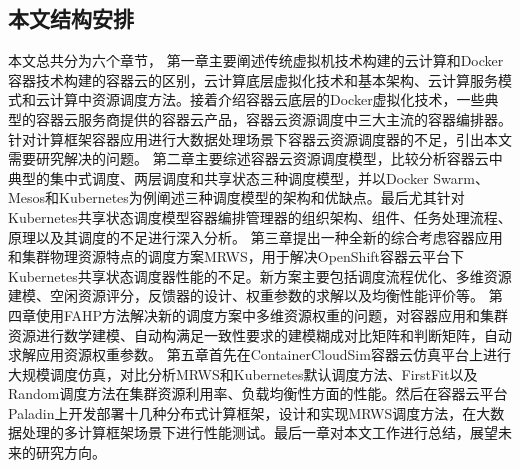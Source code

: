 \subsection{本文结构安排}
本文总共分为六个章节，
第一章主要阐述传统虚拟机技术构建的云计算和Docker容器技术构建的容器云的区别，云计算底层虚拟化技术和基本架构、云计算服务模式和云计算中资源调度方法。接着介绍容器云底层的Docker虚拟化技术，一些典型的容器云服务商提供的容器云产品，容器云资源调度中三大主流的容器编排器。针对计算框架容器应用进行大数据处理场景下容器云资源调度器的不足，引出本文需要研究解决的问题。
第二章主要综述容器云资源调度模型，比较分析容器云中典型的集中式调度、两层调度和共享状态三种调度模型，并以Docker Swarm、Mesos和Kubernetes为例阐述三种调度模型的架构和优缺点。最后尤其针对Kubernetes共享状态调度模型容器编排管理器的组织架构、组件、任务处理流程、原理以及其调度的不足进行深入分析。
第三章提出一种全新的综合考虑容器应用和集群物理资源特点的调度方案MRWS，用于解决OpenShift容器云平台下Kubernetes共享状态调度器性能的不足。新方案主要包括调度流程优化、多维资源建模、空闲资源评分，反馈器的设计、权重参数的求解以及均衡性能评价等。
第四章使用FAHP方法解决新的调度方案中多维资源权重的问题，对容器应用和集群资源进行数学建模、自动构满足一致性要求的建模糊成对比矩阵和判断矩阵，自动求解应用资源权重参数。
第五章首先在ContainerCloudSim容器云仿真平台上进行大规模调度仿真，对比分析MRWS和Kubernetes默认调度方法、FirstFit以及Random调度方法在集群资源利用率、负载均衡性方面的性能。然后在容器云平台Paladin上开发部署十几种分布式计算框架，设计和实现MRWS调度方法，在大数据处理的多计算框架场景下进行性能测试。最后一章对本文工作进行总结，展望未来的研究方向。

